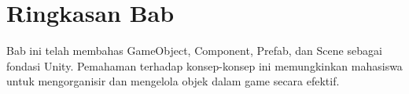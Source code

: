 \section{Ringkasan Bab}

Bab ini telah membahas GameObject, Component, Prefab, dan Scene sebagai fondasi Unity. Pemahaman terhadap konsep-konsep ini memungkinkan mahasiswa untuk mengorganisir dan mengelola objek dalam game secara efektif.
